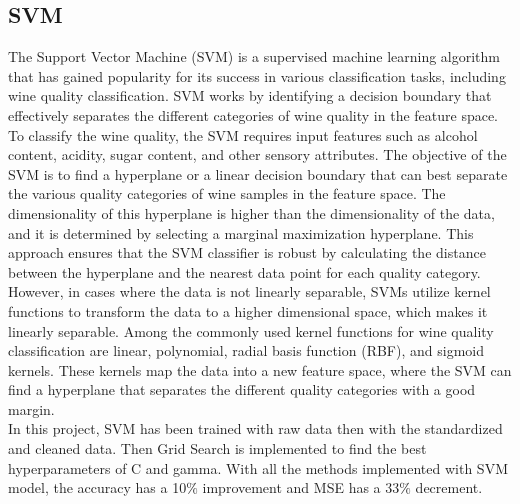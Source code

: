 \documentclass[conference]{IEEEtran}
\begin{document}
%

\subsection{SVM}
The Support Vector Machine (SVM) is a supervised machine learning algorithm that has gained popularity for its success in various classification tasks, including wine quality classification. SVM works by identifying a decision boundary that effectively separates the different categories of wine quality in the feature space.\\

To classify the wine quality, the SVM requires input features such as alcohol content, acidity, sugar content, and other sensory attributes. The objective of the SVM is to find a hyperplane or a linear decision boundary that can best separate the various quality categories of wine samples in the feature space. The dimensionality of this hyperplane is higher than the dimensionality of the data, and it is determined by selecting a marginal maximization hyperplane. This approach ensures that the SVM classifier is robust by calculating the distance between the hyperplane and the nearest data point for each quality category.\\

However, in cases where the data is not linearly separable, SVMs utilize kernel functions to transform the data to a higher dimensional space, which makes it linearly separable. Among the commonly used kernel functions for wine quality classification are linear, polynomial, radial basis function (RBF), and sigmoid kernels. These kernels map the data into a new feature space, where the SVM can find a hyperplane that separates the different quality categories with a good margin.\cite{b3}\\

In this project, SVM has been trained with raw data then with the standardized and cleaned data. Then Grid Search is implemented to find the best hyperparameters of C and gamma. With all the methods implemented with SVM model, the accuracy has a 10$\%$ improvement and MSE has a 33$\%$ decrement. 
\end{document}
